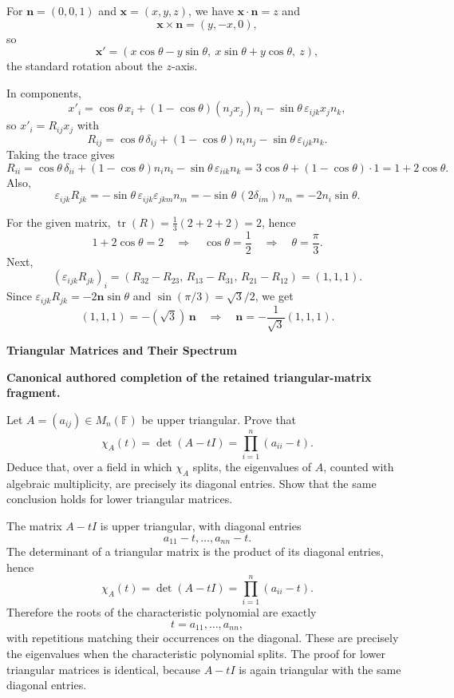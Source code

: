 \begin{solution}
For $\mathbf n=(0,0,1)$ and $\mathbf x=(x,y,z)$, we have $\mathbf x\cdot\mathbf n=z$ and
\[
\mathbf x\times\mathbf n=(y,-x,0),
\]
so
\[
\mathbf x'=(x\cos\theta-y\sin\theta,\ x\sin\theta+y\cos\theta,\ z),
\]
the standard rotation about the $z$-axis.

In components,
\[
x'_i=\cos\theta\,x_i+(1-\cos\theta)(n_jx_j)n_i-\sin\theta\,\varepsilon_{ijk}x_jn_k,
\]
so $x'_i=R_{ij}x_j$ with
\[
R_{ij}=\cos\theta\,\delta_{ij}+(1-\cos\theta)n_in_j-\sin\theta\,\varepsilon_{ijk}n_k.
\]
Taking the trace gives
\[
R_{ii}=\cos\theta\,\delta_{ii}+(1-\cos\theta)n_in_i-\sin\theta\,\varepsilon_{iik}n_k
=3\cos\theta+(1-\cos\theta)\cdot 1
=1+2\cos\theta.
\]
Also,
\[
\varepsilon_{ijk}R_{jk}
=-\sin\theta\,\varepsilon_{ijk}\varepsilon_{jkm}n_m
=-\sin\theta\,(2\delta_{im})n_m
=-2n_i\sin\theta.
\]

For the given matrix, $\operatorname{tr}(R)=\frac13(2+2+2)=2$, hence
\[
1+2\cos\theta=2\quad\Rightarrow\quad \cos\theta=\frac12\quad\Rightarrow\quad \theta=\frac{\pi}{3}.
\]
Next,
\[
(\varepsilon_{ijk}R_{jk})_{i}=(R_{32}-R_{23},\,R_{13}-R_{31},\,R_{21}-R_{12})=(1,1,1).
\]
Since $\varepsilon_{ijk}R_{jk}=-2\mathbf n\sin\theta$ and $\sin(\pi/3)=\sqrt3/2$, we get
\[
(1,1,1)=-(\sqrt3)\,\mathbf n
\quad\Rightarrow\quad
\mathbf n=-\frac{1}{\sqrt3}(1,1,1).
\]
\end{solution}

\begin{problem}[CP-I-0015]
\label{prob:cp-i-0015}
\textbf{Triangular Matrices and Their Spectrum}

\textbf{Canonical authored completion of the retained triangular-matrix fragment.}

\hspace*{1.5em}Let \(A=(a_{ij})\in M_n(\mathbb F)\) be upper triangular.
Prove that
\[
\chi_A(t)=\det(A-tI)=\prod_{i=1}^{n}(a_{ii}-t).
\]
Deduce that, over a field in which \(\chi_A\) splits, the eigenvalues of \(A\), counted with
algebraic multiplicity, are precisely its diagonal entries. Show that the same conclusion holds
for lower triangular matrices.
\end{problem}

\begin{solution}
The matrix \(A-tI\) is upper triangular, with diagonal entries
\[
a_{11}-t,\dots,a_{nn}-t.
\]
The determinant of a triangular matrix is the product of its diagonal entries, hence
\[
\chi_A(t)=\det(A-tI)=\prod_{i=1}^{n}(a_{ii}-t).
\]
Therefore the roots of the characteristic polynomial are exactly
\[
t=a_{11},\dots,a_{nn},
\]
with repetitions matching their occurrences on the diagonal. These are precisely the eigenvalues
when the characteristic polynomial splits. The proof for lower triangular matrices is identical,
because \(A-tI\) is again triangular with the same diagonal entries.
\end{solution}

